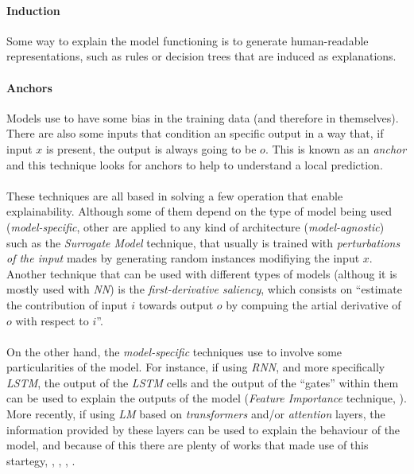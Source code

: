 	\paragraph{Induction} Some way to explain the model functioning is to generate human-readable representations, such as rules or decision trees that are induced as explanations.
	\paragraph{Anchors} Models use to have some bias in the training data (and therefore in themselves). There are also some inputs that condition an specific output in a way that, if input $x$ is present, the output is always going to be $o$. This is known as an \emph{anchor} and this technique looks for anchors to help to understand a local prediction.
\paragraph{}
These techniques are all based in solving a few operation that enable explainability. Although some of them depend on the type of model being used (\emph{model-specific}, other are applied to any kind of architecture (\emph{model-agnostic}) such as the \emph{Surrogate Model} technique, that usually is trained with \emph{perturbations of the input}\cite{Ribeiro2016} mades by generating random instances modifiying the input $x$. Another technique that can be used with different types of models (althoug it is mostly used with \emph{NN}) is the \emph{first-derivative saliency}, which consists on ``estimate the contribution of input $i$ towards output $o$ by compuing the artial derivative of $o$ with respect to $i$''.\cite{Danilevsky2020}
\paragraph{}
On the other hand, the \emph{model-specific} techniques use to involve some particularities of the model. For instance, if using \emph{RNN}, and more specifically \emph{LSTM}, the output of the \emph{LSTM} cells and the output of the ``gates'' within them can be used to explain the outputs of the model (\emph{Feature Importance} technique, \cite{Ghaeini2018}). More recently, if using \emph{LM} based on \emph{transformers} and/or \emph{attention} layers, the information provided by these layers can be used to explain the behaviour of the model, and because of this there are plenty of works that made use of this startegy, \cite{Luo2018}, \cite{Xie2017}, \cite{Serrano2019}, \cite{Jain2019}.
